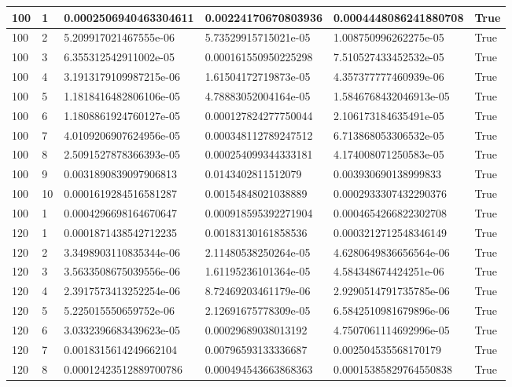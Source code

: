 \documentclass[a4paper, 12pt]{report}
\def\tabsize{4.4cm}
\def\stabsize{0.97cm}
\def\mtabsize{0.73cm}
\begin{document}
\begin{center}
\begin{longtable}{|m{\stabsize}|m{\stabsize}|m{\tabsize}|m{\tabsize}|m{\tabsize}|m{\mtabsize}|}
100 & 1 & 0.0002506940463304611 & 0.00224170670803936 & 0.0004448086241880708 & True \\ \hline  
100 & 2 & 5.209917021467555e-06 & 5.73529915715021e-05 & 1.008750996262275e-05 & True \\ \hline  
100 & 3 & 6.355312542911002e-05 & 0.000161550950225298 & 7.510527433452532e-05 & True \\ \hline  
100 & 4 & 3.1913179109987215e-06 & 1.61504172719873e-05 & 4.357377777460939e-06 & True \\ \hline  
100 & 5 & 1.1818416482806106e-05 & 4.78883052004164e-05 & 1.5846768432046913e-05 & True \\ \hline  
100 & 6 & 1.1808861924760127e-05 & 0.000127824277750044 & 2.106173184635491e-05 & True \\ \hline  
100 & 7 & 4.0109206907624956e-05 & 0.000348112789247512 & 6.713868053306532e-05 & True \\ \hline  
100 & 8 & 2.5091527878366393e-05 & 0.000254099344333181 & 4.174008071250583e-05 & True \\ \hline  
100 & 9 & 0.0031890839097906813 & 0.0143402811512079 & 0.003930690138999833 & True \\ \hline  
100 & 10 & 0.0001619284516581287 & 0.00154848021038889 & 0.0002933307432290376 & True \\ \hline  
100 & 1 & 0.0004296698164670647 & 0.000918595392271904 & 0.0004654266822302708 & True \\ \hline  
120 & 1 & 0.0001871438542712235 & 0.00183130161858536 & 0.0003212712548346149 & True \\ \hline  
120 & 2 & 3.3498903110835344e-06 & 2.11480538250264e-05 & 4.6280649836656564e-06 & True \\ \hline  
120 & 3 & 3.5633508675039556e-06 & 1.61195236101364e-05 & 4.584348674424251e-06 & True \\ \hline  
120 & 4 & 2.3917573413252254e-06 & 8.72469203461179e-06 & 2.9290514791735785e-06 & True \\ \hline  
120 & 5 & 5.225015550659752e-06 & 2.12691675778309e-05 & 6.5842510981679896e-06 & True \\ \hline  
120 & 6 & 3.0332396683439623e-05 & 0.00029689038013192 & 4.7507061114692996e-05 & True \\ \hline  
120 & 7 & 0.0018315614249662104 & 0.00796593133336687 & 0.002504535568170179 & True \\ \hline  
120 & 8 & 0.00012423512889700786 & 0.000494543663868363 & 0.00015385829764550838 & True \\ \hline  

\end{longtable}
\end{center}
\end{document}
